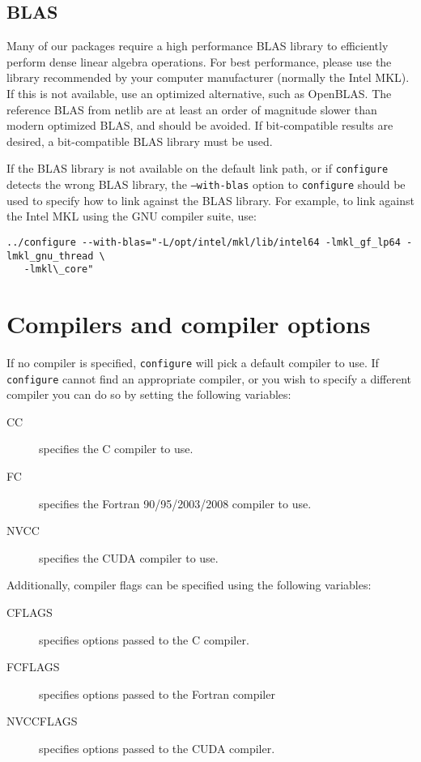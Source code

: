 \documentclass{spral}
\begin{document}
\subsection{BLAS}
Many of our packages require a high performance BLAS library to efficiently
perform dense linear algebra operations. For best performance, please use the
library recommended by your computer manufacturer (normally the Intel MKL).
If this is not available, use an optimized alternative, such as OpenBLAS.
The reference BLAS from netlib are at least an order of magnitude slower than
modern optimized BLAS, and should be avoided. If bit-compatible results are
desired, a bit-compatible BLAS library must be used.

If the BLAS library is not available on the default link path, or if
\texttt{configure} detects the wrong BLAS library, the \texttt{--with-blas}
option to \texttt{configure} should be used to specify how to link against
the BLAS library. For example, to link against the Intel MKL using the GNU
compiler suite, use: \\
\begin{verbatim}
../configure --with-blas="-L/opt/intel/mkl/lib/intel64 -lmkl_gf_lp64 -lmkl_gnu_thread \
   -lmkl\_core"
\end{verbatim}

\section{Compilers and compiler options}
If no compiler is specified, \texttt{configure} will pick a default
compiler to use. If \texttt{configure} cannot find an appropriate compiler, or
you wish to specify a different compiler you can do so by setting the following
variables:
\begin{description}
   \item[CC] specifies the C compiler to use.
   \item[FC] specifies the Fortran 90/95/2003/2008 compiler to use.
   \item[NVCC] specifies the CUDA compiler to use.
\end{description}
\vspace{0.1cm}

\noindent
Additionally, compiler flags can be specified using the following variables:
\begin{description}
   \item[CFLAGS] specifies options passed to the C compiler.
   \item[FCFLAGS] specifies options passed to the Fortran compiler
   \item[NVCCFLAGS] specifies options passed to the CUDA compiler.
\end{description}
\vspace{0.1cm}
\end{document}
